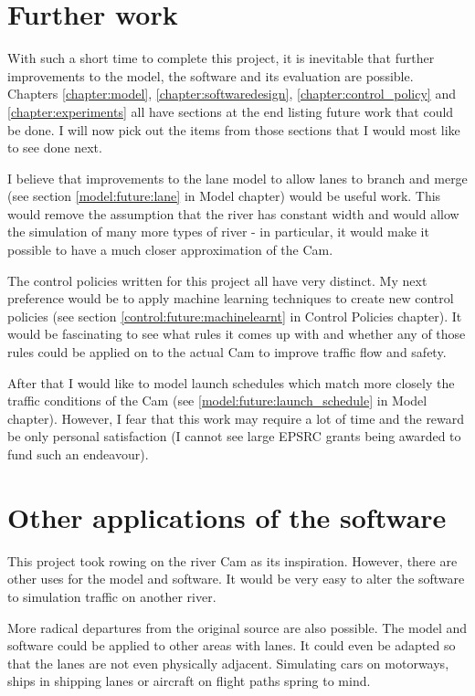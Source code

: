   \section{Further work}
  With such a short time to complete this project, it is inevitable that further improvements to the model, the software and its evaluation are possible. Chapters \ref{chapter:model}, \ref{chapter:softwaredesign}, \ref{chapter:control_policy} and \ref{chapter:experiments} all have sections at the end listing future work that could be done. I will now pick out the items from those sections that I would most like to see done next.
  
  I believe that improvements to the lane model to allow lanes to branch and merge (see section \ref{model:future:lane} in Model chapter) would be useful work. This would remove the assumption that the river has constant width and would allow the simulation of many more types of river - in particular, it would make it possible to have a much closer approximation of the Cam.
  
  The control policies written for this project all have very distinct. My next preference would be to apply machine learning techniques to create new control policies (see section \ref{control:future:machinelearnt} in Control Policies chapter). It would be fascinating to see what rules it comes up with and whether any of those rules could be applied on to the actual Cam to improve traffic flow and safety.
  
  After that I would like to model launch schedules which match more closely the traffic conditions of the Cam (see \ref{model:future:launch_schedule} in Model chapter). However, I fear that this work may require a lot of time and the reward be only personal satisfaction (I cannot see large EPSRC grants being awarded to fund such an endeavour).
  
  \section{Other applications of the software}\label{conclusions:applications}
  This project took rowing on the river Cam as its inspiration. However, there are other uses for the model and software. It would be very easy to alter the software to simulation traffic on another river.
  
  More radical departures from the original source are also possible. The model and software could be applied to other areas with lanes. It could even be adapted so that the lanes are not even physically adjacent. Simulating cars on motorways, ships in shipping lanes or aircraft on flight paths spring to mind.
  
